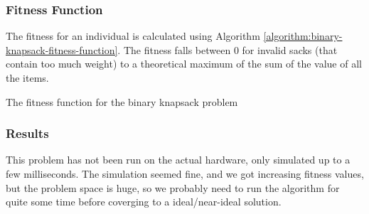 \subsubsection{Fitness Function}
The fitness for an individual is calculated using Algorithm \ref{algorithm:binary-knapsack-fitness-function}.
The fitness falls between 0 for invalid sacks (that contain too much weight) to a theoretical maximum of the sum of the value of all the items.

\begin{algorithm}[H]
\SetAlgoLined
\DontPrintSemicolon
{}
\caption{The fitness function for the binary knapsack problem}
\label{algorithm:binary-knapsack-fitness-function}
\end{algorithm}

\subsubsection{Results}

This problem has not been run on the actual hardware, only simulated up to a few milliseconds.
The simulation seemed fine, and we got increasing fitness values, but the problem space is huge, so we probably need to run the algorithm for quite some time before coverging to a ideal/near-ideal solution.


%
%

